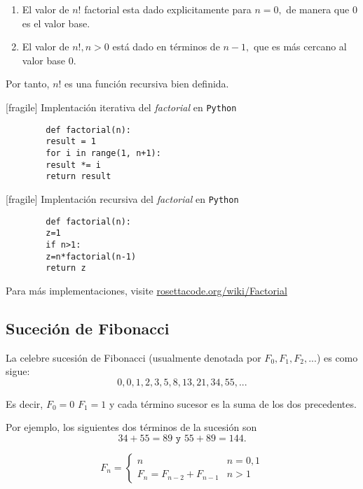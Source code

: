 	\begin{rem}
		\begin{enumerate}
			\item El valor de $n!$ factorial esta dado explicitamente para $n=0,$ de manera que $0$ es el valor base. 
			\item El valor de $n!, n>0$ está dado en t\'erminos de $n-1,$ que es más cercano al valor base $0.$    
		\end{enumerate}
		
		Por tanto, $n!$ es una función recursiva bien definida.
	\end{rem}
	


[fragile]
	{Implentación iterativa del \emph{factorial} en \texttt{Python}}
	\begin{verbatim}
		def factorial(n):
		result = 1
		for i in range(1, n+1):
		result *= i
		return result
	\end{verbatim} 


[fragile]
	{Implentación recursiva del \emph{factorial} en \texttt{Python}}
	\begin{verbatim}
		def factorial(n):
		z=1
		if n>1:
		z=n*factorial(n-1)
		return z
	\end{verbatim}
	Para más implementaciones, visite \href{https://rosettacode.org/wiki/Factorial}{rosettacode.org/wiki/Factorial}



\subsection{Suceción de Fibonacci}


	La celebre sucesión de Fibonacci (usualmente denotada por $F_{0}, F_{1}, F_{2},...$) es como sigue:
	$$
	0,0,1,2,3,5,8,13,21,34,55,...
	$$
	
	Es decir, $F_{0}=0$  $F_{1}=1$ y cada t\'ermino sucesor es la suma de los dos precedentes.



	Por ejemplo, los siguientes dos t\'erminos de la sucesión son
	$$34+55=89 \texttt{ y }55+89=144.$$



	\begin{defn}
		$$
		F_{n}=
		\begin{cases}
			n & n=0,1 \\
			F_{n}=F_{n-2}+F_{n-1} & n>1
		\end{cases}
		$$
	\end{defn}



